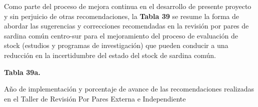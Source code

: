 \documentclass[
  spanish,
]{article}
\begin{document}
Como parte del proceso de mejora continua en el desarrollo de presente
proyecto y sin perjuicio de otras recomendaciones, la \textbf{Tabla 39}
se resume la forma de abordar las sugerencias y correcciones
recomendadas en la revisión por pares de sardina común centro-sur para
el mejoramiento del proceso de evaluación de stock (estudios y programas
de investigación) que pueden conducir a una reducción en la
incertidumbre del estado del stock de sardina común. \vspace{0.5cm}

\small
\begin{center} 
\textbf{Tabla 39a.}
\end{center}
\begin{center} 
\vspace{-0.2cm} Año de implementación y porcentaje de avance de las recomendaciones realizadas en el Taller de Revisión Por Pares Externa e Independiente
\end{center}
\vspace{-0.2cm}
\end{document}
